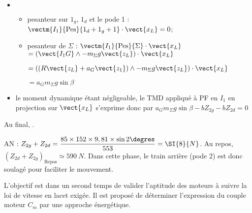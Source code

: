 \begin{corrige}
\begin{itemize}
\item $\quad$
\begin{itemize}
\item pesanteur sur $1_g$, $1_d$ et le pode 1 :  $\vectm{I_1}{\text{Pes}}{1_d+1_g+1}\cdot \vect{x_L}=0$;
\item pesanteur de $\Sigma$ : $\vectm{I_1}{\text{Pes}}{\Sigma}\cdot \vect{x_L}$
$ = \left(\vect{I_1 G} \wedge - m_\Sigma g \vect{z_L}\right) \cdot \vect{x_L}$

$ = \left(\left(R \vect{z_L}+ a_G \vect{z_1}\right) \wedge - m_\Sigma g \vect{z_L}\right) \cdot \vect{x_L}$


$ = a_G  m_\Sigma g \sin \beta$

\end{itemize}
\item le moment dynamique étant négligeable, le TMD appliqué à PF en $I_1$ en projection sur $\vect{x_L}$ s'exprime donc par 
$ a_G  m_\Sigma g \sin \beta -b Z_{2g}-bZ_{2d} =0 $
\end{itemize}

Au final, .

AN : $Z_{2g}+ Z_{2d}= \dfrac{ 85\times 152 \times  9,81 \times  \sin 2\degres  }{553}=\SI{8}{N} $.
Au repos, $\left(Z_{2d}+Z_{2g}\right)_{\text{Repos}} \simeq \SI{590}{N}$. Dans cette phase, le train arrière (pode 2) est donc soulagé pour faciliter le mouvement. 

\end{corrige}

\else
\fi


L’objectif est dans un second temps de valider l’aptitude des moteurs à suivre la loi de vitesse en lacet exigée. Il est
proposé de déterminer l’expression du couple moteur $C_m$ par une approche énergétique.


